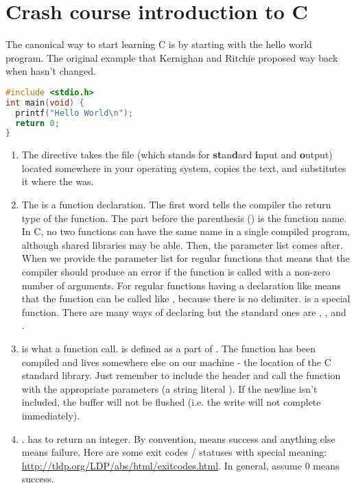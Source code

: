 \section{Crash course introduction to C}

The canonical way to start learning C is by starting with the hello world program.
The original example that Kernighan and Ritchie proposed way back when hasn't changed.

\begin{lstlisting}[language=C]
#include <stdio.h>
int main(void) {
  printf("Hello World\n");
  return 0;
}
\end{lstlisting}

\begin{enumerate}
	\item The  directive takes the file  (which stands for \textbf{st}an\textbf{d}ard \textbf{i}nput and \textbf{o}utput) located somewhere in your operating system, copies the text, and substitutes it where the  was.
	\item The  is a function declaration.
    The first word  tells the compiler the return type of the function.
    The part before the parenthesis () is the function name.
    In C, no two functions can have the same name in a single compiled program, although shared libraries may be able.
    Then, the parameter list comes after.
    When we provide the parameter list for regular functions  that means that the compiler should produce an error if the function is called with a non-zero number of arguments.
    For regular functions having a declaration like  means that the function can be called like , because there is no delimiter.
     is a special function.
    There are many ways of declaring  but the standard ones are , , and .
	\item {} is what a function call.
     is defined as a part of .
    The function has been compiled and lives somewhere else on our machine - the location of the C standard library.
    Just remember to include the header and call the function with the appropriate parameters (a string literal ).
    If the newline isn't included, the buffer will not be flushed (i.e. the write will not complete immediately).
	\item {}.
     has to return an integer.
    By convention,  means success and anything else means failure.
    Here are some exit codes / statuses with special meaning: \url{http://tldp.org/LDP/abs/html/exitcodes.html}.
    In general, assume 0 means success.
\end{enumerate}

